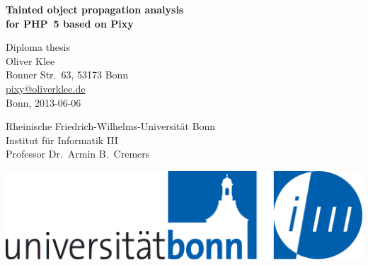 \begin{titlepage}

\begin{center}
\huge\textbf{\textsf{\textcolor{blue_cs3}{Tainted object propagation analysis\\for PHP~5 based on Pixy}}\normalsize}
\end{center}

\vfill

\begin{center}
  \textsf{
    Diploma thesis\\
    \vspace{1em}
    Oliver Klee\\
    Bonner Str.~63, 53173 Bonn\\
    \url{pixy@oliverklee.de}\\
    \vspace{1em}
    Bonn, 2013-06-06
  }
\end{center}

\vfill

\begin{minipage}{8cm}
  \textsf{Rheinische Friedrich-Wilhelms-Universität Bonn\\Institut für Informatik III\\Professor Dr.~Armin B.~Cremers}
\end{minipage}
\begin{minipage}{8cm}
\includegraphics[scale=.12]{images/logo_ubo_i3_rgb}{}
\end{minipage}

\end{titlepage}
